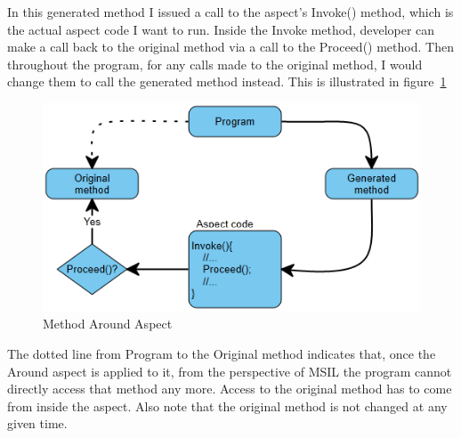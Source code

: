 In this generated method I issued a call to the aspect’s Invoke() method, which is the actual aspect code I want to run. Inside the Invoke method, developer can make a call back to the original method via a call to the Proceed() method. Then throughout the program, for any calls made to the original method, I would change them to call the generated method instead. This is illustrated in figure~\ref{around_overview}

\begin{figure}[H]
  \includegraphics[scale=1.0]{AroundOverview.PNG}
  \centering
  \caption{Method Around Aspect\label{around_overview}}
\end{figure}

The dotted line from Program to the Original method indicates that, once the Around aspect is applied to it, from the perspective of MSIL the program cannot directly access that method any more. Access to the original method has to come from inside the aspect. Also note that the original method is not changed at any given time.

